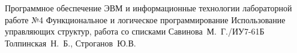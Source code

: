 \documentclass{bmstu}
\begin{document}
	
	{Программное обеспечение ЭВМ и информационные технологии}
	{лабораторной работе №4}
	{Функциональное и логическое программирование}
	{Использование управляющих структур, работа со списками}
	{}
	{Савинова~М.~Г./ИУ7-61Б}
	{Толпинская~Н.~Б., Строганов~Ю.В.}
	
	\maketableofcontents
	
	
	
	
\end{document}
